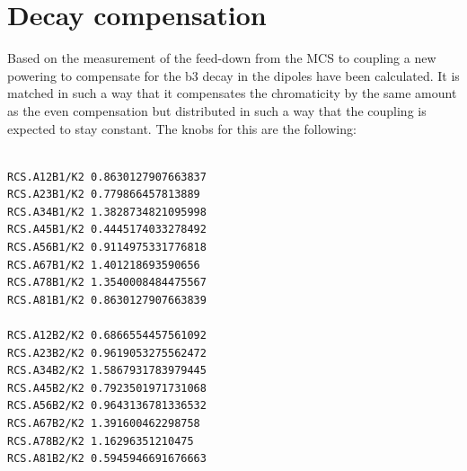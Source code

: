\documentclass[a4paper]{cernatsnote}
\begin{document}
\begin{thebibliography}{99}   %
\end{thebibliography}
\appendix
\section{Decay compensation}
Based on the measurement of the feed-down from the MCS to coupling a new powering to compensate for the b3 decay in the dipoles have been calculated. It is matched in such a way that it compensates the chromaticity by the same amount as the even compensation but distributed in such a way that the coupling is expected to stay constant. The knobs for this are the following:
\begin{verbatim}

RCS.A12B1/K2 0.8630127907663837 
RCS.A23B1/K2 0.779866457813889 
RCS.A34B1/K2 1.3828734821095998 
RCS.A45B1/K2 0.4445174033278492 
RCS.A56B1/K2 0.9114975331776818 
RCS.A67B1/K2 1.401218693590656 
RCS.A78B1/K2 1.3540008484475567 
RCS.A81B1/K2 0.8630127907663839 

RCS.A12B2/K2 0.6866554457561092 
RCS.A23B2/K2 0.9619053275562472 
RCS.A34B2/K2 1.5867931783979445 
RCS.A45B2/K2 0.7923501971731068 
RCS.A56B2/K2 0.9643136781336532 
RCS.A67B2/K2 1.391600462298758 
RCS.A78B2/K2 1.16296351210475 
RCS.A81B2/K2 0.5945946691676663 

\end{verbatim}
\end{document}
